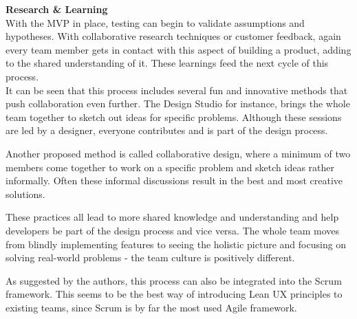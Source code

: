 \textbf{Research \& Learning} \\
With the MVP in place, testing can begin to validate assumptions and hypotheses. With collaborative
research techniques or customer feedback, again every team member gets in contact with this aspect
of building a product, adding to the shared understanding of it. These learnings feed the next cycle
of this process.  \\

It can be seen that this process includes several fun and innovative methods that push collaboration
even further. The Design Studio for instance, brings the whole team together to sketch out ideas for
specific problems. Although these sessions are led by a designer, everyone contributes and is part
of the design process. 

Another proposed method is called collaborative design, where a minimum of two members come together
to work on a specific problem and sketch ideas rather informally. Often these informal discussions
result in the best and most creative solutions.

These practices all lead to more shared knowledge and understanding and help developers be part of
the design process and vice versa. The whole team moves from blindly implementing features to seeing
the holistic picture and focusing on solving real-world problems - the team culture is positively
different.

As suggested by the authors, this process can also be integrated into the Scrum framework. This
seems to be the best way of introducing Lean UX principles to existing teams, since Scrum is by far
the most used Agile framework.
